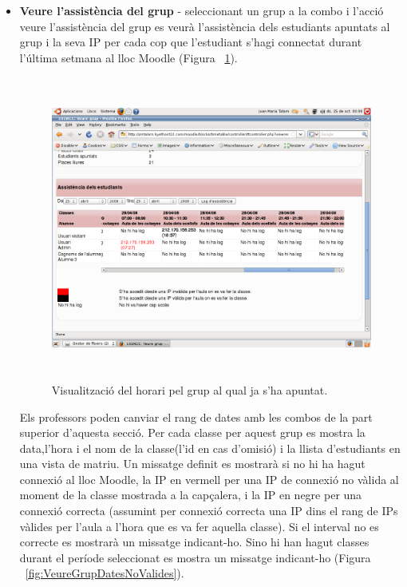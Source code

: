 \documentclass[a4paper]{report}  %
\begin{document}
\begin{itemize}
\item\textbf{Veure l'assistència del grup} - seleccionant un grup a la combo i l'acció veure l'assistència del grup es veurà l'assistència dels estudiants apuntats al grup i la seva IP per cada cop que l'estudiant s'hagi connectat durant l'última setmana al lloc Moodle (Figura ~\ref{fig:VeureGrupsLogAssistenciaIPNoValidaIpValida}).
		\begin{figure}[H] %
		\begin{center}
		\includegraphics[height=10cm,width=12cm]{img/VeureGrupsLogAssistenciaIPNoValidaIpValida.png}
		\caption[List caption]{Visualització del horari pel grup al qual ja s'ha apuntat.}
		\label{fig:VeureGrupsLogAssistenciaIPNoValidaIpValida}
		\end{center}
		\end{figure}
Els professors poden canviar el rang de dates amb les combos de la part superior d'aquesta secció. 
Per cada classe per aquest grup es mostra la data,l'hora i el nom de la classe(l'id en cas d'omisió) i la llista d'estudiants en una vista de matriu.
Un missatge definit es mostrarà si no hi ha hagut connexió al lloc Moodle, la IP en vermell per una IP de connexió no vàlida al moment de la classe mostrada a la capçalera, i la IP en negre per una connexió correcta (assumint per connexió correcta una IP dins el rang de IPs vàlides per l'aula a l'hora que es va fer aquella  classe).
Si el interval no es correcte es mostrarà un missatge indicant-ho. Sino hi han hagut classes durant el període seleccionat es mostra un missatge indicant-ho (Figura ~\ref{fig:VeureGrupDatesNoValides}).

\end{itemize}
\end{document}
